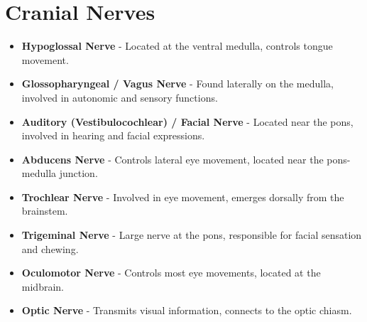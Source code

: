 \section{Cranial Nerves}
\begin{itemize}
    \item \textbf{Hypoglossal Nerve} - Located at the ventral medulla, controls tongue movement.
    \item \textbf{Glossopharyngeal / Vagus Nerve} - Found laterally on the medulla, involved in autonomic and sensory functions.
    \item \textbf{Auditory (Vestibulocochlear) / Facial Nerve} - Located near the pons, involved in hearing and facial expressions.
    \item \textbf{Abducens Nerve} - Controls lateral eye movement, located near the pons-medulla junction.
    \item \textbf{Trochlear Nerve} - Involved in eye movement, emerges dorsally from the brainstem.
    \item \textbf{Trigeminal Nerve} - Large nerve at the pons, responsible for facial sensation and chewing.
    \item \textbf{Oculomotor Nerve} - Controls most eye movements, located at the midbrain.
    \item \textbf{Optic Nerve} - Transmits visual information, connects to the optic chiasm.
\end{itemize}